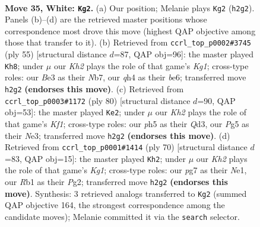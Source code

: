 \documentclass[11pt]{article}
\begin{document}
\clearpage

\begin{figure}[p]\centering
\begin{subfigure}{0.46\textwidth}\centering
\resizebox{\linewidth}{!}{%
\newchessgame
\chessboard[
  setfen={6nr/1kr3p1/8/2p1Q1Pp/2P2P1q/N3B3/PP5K/1R6 w - - 7 35},
  showmover=false,
  pgfstyle=straightmove, color=movearrow, markmove={h2-g2}
]}
\caption{}
\end{subfigure}\hfill
\begin{subfigure}{0.46\textwidth}\centering
\resizebox{\linewidth}{!}{%
\newchessgame
\chessboard[
  setfen={1r4k1/pnq3p1/4B2p/2P1p3/8/2Q1pPb1/P5P1/K2R3R b - - 0 28},
  showmover=false,
  pgfstyle=straightmove, color=movearrow, markmove={g8-h8}
]}
\caption{}
\end{subfigure}
\\[4pt]
\begin{subfigure}{0.46\textwidth}\centering
\resizebox{\linewidth}{!}{%
\newchessgame
\chessboard[
  setfen={2r5/2k5/4p3/ppr1p3/8/P2QN1BP/2B2PP1/q4K2 w - - 14 41},
  showmover=false,
  pgfstyle=straightmove, color=movearrow, markmove={f1-e2}
]}
\caption{}
\end{subfigure}\hfill
\begin{subfigure}{0.46\textwidth}\centering
\resizebox{\linewidth}{!}{%
\newchessgame
\chessboard[
  setfen={k2rr3/p1R5/1p2p3/1P2Q1pp/3P4/6P1/5PP1/1q2N1K1 w - - 4 36},
  showmover=false,
  pgfstyle=straightmove, color=movearrow, markmove={g1-h2}
]}
\caption{}
\end{subfigure}
\caption{\textbf{Move 35, White: \texttt{Kg2}.} (a) Our position; Melanie plays \texttt{Kg2} (\texttt{h2g2}). Panels (b)--(d) are the retrieved master positions whose correspondence most drove this move (highest QAP objective among those that transfer to it). (b) Retrieved from \texttt{ccrl\_top\_p0002\#3745} (ply 55) [structural distance $d$=87, QAP obj=96]: the master played \texttt{Kh8}; under $\mu$ our \emph{Kh2} plays the role of that game's \emph{Kg1}; cross-type roles: our \emph{B}e3 as their \emph{N}b7, our \emph{q}h4 as their \emph{b}e6; transferred move \texttt{h2g2} \textbf{(endorses this move)}. (c) Retrieved from \texttt{ccrl\_top\_p0003\#1172} (ply 80) [structural distance $d$=90, QAP obj=53]: the master played \texttt{Ke2}; under $\mu$ our \emph{Kh2} plays the role of that game's \emph{Kf1}; cross-type roles: our \emph{p}h5 as their \emph{Q}d3, our \emph{P}g5 as their \emph{N}e3; transferred move \texttt{h2g2} \textbf{(endorses this move)}. (d) Retrieved from \texttt{ccrl\_top\_p0001\#1414} (ply 70) [structural distance $d$=83, QAP obj=15]: the master played \texttt{Kh2}; under $\mu$ our \emph{Kh2} plays the role of that game's \emph{Kg1}; cross-type roles: our \emph{p}g7 as their \emph{N}e1, our \emph{R}b1 as their \emph{P}g2; transferred move \texttt{h2g2} \textbf{(endorses this move)}. Synthesis: 3 retrieved analogs transferred to \texttt{Kg2} (summed QAP objective 164, the strongest correspondence among the candidate moves); Melanie committed it via the \texttt{search} selector.}
\label{fig:thought-m68}
\end{figure}
\end{document}
